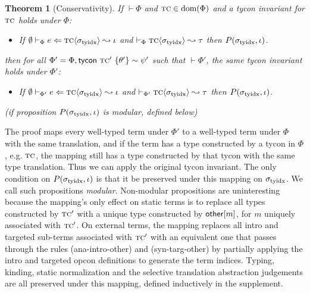 \documentclass[10pt,preprint]{sigplanconf}
\newtheorem{theorem}{Theorem}
\newenvironment{proof-sketch}{\noindent{\emph{Proof Sketch.}}}{\qed}
\begin{document}
\begin{theorem}[Conservativity] If $\vdash \Phi$ and $\textsc{tc} \in \text{dom}(\Phi)$ and a tycon invariant for $\textsc{tc}$ holds under $\Phi$: \begin{itemize}
\item If $\emptyset \vdash_{\Phi} e \Leftarrow {\textsc{tc}}\langle\sigma_\text{tyidx}\rangle \leadsto \iota$ and $\vdash_\Phi {{\textsc{tc}}\langle\sigma_\text{tyidx}\rangle} \leadsto \tau$  then $P(\sigma_\text{tyidx}, \iota)$.
\end{itemize} then for all $\Phi' = \Phi, {\sf tycon}~\textsc{tc}' ~\{\theta'\} \sim \psi'$ such that $\vdash \Phi'$, the same tycon invariant holds under $\Phi'$: \begin{itemize}
\item If $\emptyset \vdash_{\Phi'} e \Leftarrow {\textsc{tc}}\langle\sigma_\text{tyidx}\rangle \leadsto \iota$ and $\vdash_{\Phi'}{{\textsc{tc}}\langle\sigma_\text{tyidx}\rangle}\leadsto{\tau}$ then $P(\sigma_\text{tyidx}, \iota)$.
\end{itemize}
(if proposition $P(\sigma_\text{tyidx}, \iota)$ is \emph{modular}, defined below)
\end{theorem}
\begin{proof-sketch}
The proof maps every well-typed term under $\Phi'$ to a well-typed term under $\Phi$ with the same translation, and if the term has a type constructed by a tycon in $\Phi$, e.g. $\textsc{tc}$, the mapping still has a type constructed by that tycon with the same type translation. Thus we can apply the original tycon invariant. The only condition on $P(\sigma_\text{tyidx}, \iota)$ is that it be preserved under this mapping on $\sigma_\text{tyidx}$. We call such propositions \emph{modular}. Non-modular propositions are  uninteresting because the mapping's only effect on static terms is to replace all types constructed by $\textsc{tc}'$ with a unique type constructed by ${\sf other}[m]$, for $m$ uniquely associated with $\textsc{tc}'$. On external terms, the mapping replaces all intro and targeted sub-terms associated with $\textsc{tc}'$ with an equivalent one that passes through the rules (ana-intro-other) and (syn-targ-other) by partially applying the intro and targeted opcon definitions to generate the term indices. Typing, kinding, static normalization and the selective translation abstraction judgements are all preserved under this mapping, defined inductively in the supplement. \end{proof-sketch}
\end{document}
